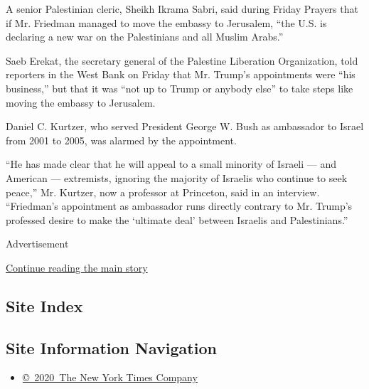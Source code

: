 A senior Palestinian cleric, Sheikh Ikrama Sabri, said during Friday
Prayers that if Mr. Friedman managed to move the embassy to Jerusalem,
``the U.S. is declaring a new war on the Palestinians and all Muslim
Arabs.''

Saeb Erekat, the secretary general of the Palestine Liberation
Organization, told reporters in the West Bank on Friday that Mr. Trump's
appointments were ``his business,'' but that it was ``not up to Trump or
anybody else'' to take steps like moving the embassy to Jerusalem.

Daniel C. Kurtzer, who served President George W. Bush as ambassador to
Israel from 2001 to 2005, was alarmed by the appointment.

``He has made clear that he will appeal to a small minority of Israeli
--- and American --- extremists, ignoring the majority of Israelis who
continue to seek peace,'' Mr. Kurtzer, now a professor at Princeton,
said in an interview. ``Friedman's appointment as ambassador runs
directly contrary to Mr. Trump's professed desire to make the `ultimate
deal' between Israelis and Palestinians.''

Advertisement

\protect\hyperlink{after-bottom}{Continue reading the main story}

\hypertarget{site-index}{%
\subsection{Site Index}\label{site-index}}

\hypertarget{site-information-navigation}{%
\subsection{Site Information
Navigation}\label{site-information-navigation}}

\begin{itemize}
\tightlist
\item
  \href{https://help.nytimes3xbfgragh.onion/hc/en-us/articles/115014792127-Copyright-notice}{©~2020~The
  New York Times Company}
\end{itemize}

